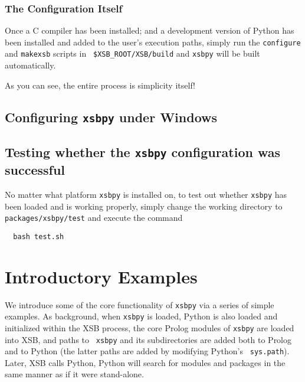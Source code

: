 \subsubsection{The Configuration Itself}

Once a C compiler has been installed; and a development version of
Python has been installed and added to the user's execution paths,
simply run the {\tt configure} and {\tt makexsb} scripts in {\tt
  \$XSB\_ROOT/XSB/build} and {\tt xsbpy} will be built automatically.

As you can see, the entire process is simplicity itself!

\subsection{Configuring {\tt xsbpy} under Windows}

\subsection{Testing whether the {\tt xsbpy} configuration was successful}

No matter what platform {\tt xsbpy} is installed on, to test out
whether {\tt xsbpy} has been loaded and is working properly, simply
change the working directory to {\tt packages/xsbpy/test} and execute the
command

\begin{verbatim}
  bash test.sh
\end{verbatim}


\section{Introductory Examples}

We introduce some of the core functionality of {\tt xsbpy} via a
series of simple examples.  As background, when {\tt xsbpy} is loaded,
Python is also loaded and initialized within the XSB process, the core
Prolog modules of {\tt xsbpy} are loaded into XSB, and paths to {\tt
  xsbpy} and its subdirectories are added both to Prolog and to Python
(the latter paths are added by modifying Python's {\tt
  sys.path}). Later, XSB calls Python, Python will search for modules
and packages in the same manner as if it were stand-alone.

